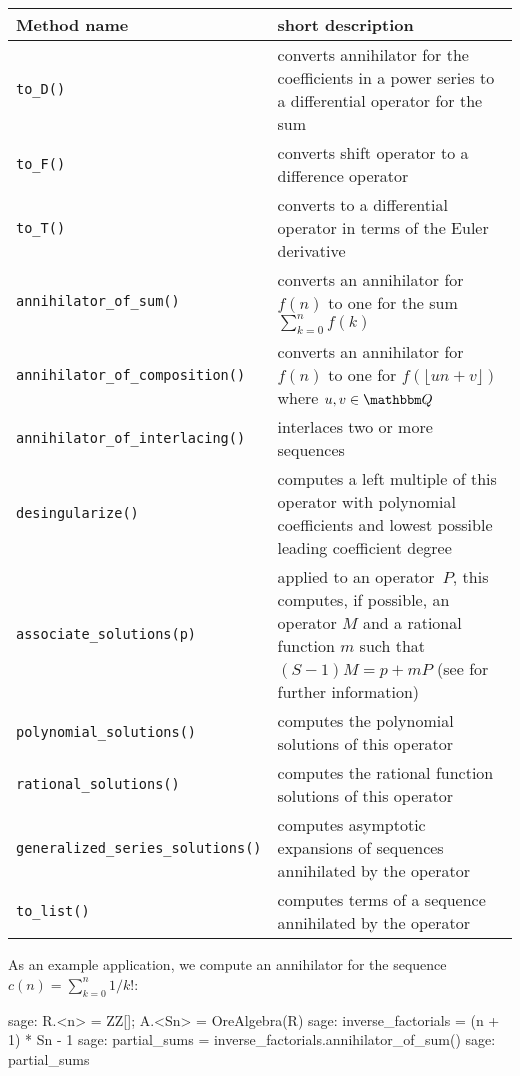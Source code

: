 \documentclass[11pt]{amsart}
\let\set\mathbbm
\begin{document}
\begin{center}
  \begin{tabular}{|l|p{.55\hsize}|}
    \hline
    Method name & short description \\\hline
    \verb|to_D()| & converts annihilator for the coefficients in a power series to a
        differential operator for the sum \\
    \verb|to_F()| & converts shift operator to a difference operator\\
    \verb|to_T()| & converts to a differential operator in terms of the Euler derivative \\
    \verb|annihilator_of_sum()| & converts an annihilator for $f(n)$ to one for the sum $\sum_{k=0}^n f(k)$\\
    \verb|annihilator_of_composition()| & converts an annihilator for $f(n)$ to one for $f(\lfloor un+v \rfloor)$ where $u, v \in \set Q$ \\
    \verb|annihilator_of_interlacing()| & interlaces two or more sequences\\
    \verb|desingularize()| & computes a left multiple of this operator with polynomial coefficients and 
           lowest possible leading coefficient degree\\
    \verb|associate_solutions(p)| & applied to an operator~$P$, this computes, if possible, an operator $M$
    and a rational function $m$ such that $(S-1)M=p+mP$ (see \cite{abramov99} for further information)\\
    \verb|polynomial_solutions()| & computes the polynomial solutions of this operator\\
    \verb|rational_solutions()| & computes the rational function solutions of this operator\\
    \verb|generalized_series_solutions()| & computes asymptotic expansions of sequences annihilated by the operator\\ 
    \verb|to_list()| & computes terms of a sequence annihilated by the operator\\\hline
  \end{tabular}
\end{center}

\smallskip

As an example application, we compute an annihilator for the sequence
$c(n) = \sum_{k=0}^n 1 / k!$:

\begin{sageexample}
  sage: R.<n> = ZZ[]; A.<Sn> = OreAlgebra(R)
  sage: inverse_factorials = (n + 1) * Sn - 1
  sage: partial_sums = inverse_factorials.annihilator_of_sum()
  sage: partial_sums
\end{sageexample}
\end{document}
